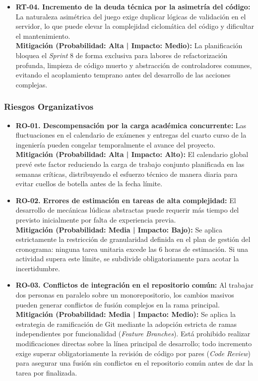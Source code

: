 \begin{itemize}
    \item \textbf{RT-04. Incremento de la deuda técnica por la asimetría del código:} La naturaleza asimétrica del juego exige duplicar lógicas de validación en el servidor, lo que puede elevar la complejidad ciclomática del código y dificultar el mantenimiento. \\
    \textbf{Mitigación (Probabilidad: Alta | Impacto: Medio):} La planificación bloquea el \textit{Sprint} 8 de forma exclusiva para labores de refactorización profunda, limpieza de código muerto y abstracción de controladores comunes, evitando el acoplamiento temprano antes del desarrollo de las acciones complejas.
\end{itemize}

\subsubsection{Riesgos Organizativos}

\begin{itemize}
    \item \textbf{RO-01. Descompensación por la carga académica concurrente:} Las fluctuaciones en el calendario de exámenes y entregas del cuarto curso de la ingeniería pueden congelar temporalmente el avance del proyecto. \\
    \textbf{Mitigación (Probabilidad: Alta | Impacto: Alto):} El calendario global prevé este factor reduciendo la carga de trabajo conjunto planificada en las semanas críticas, distribuyendo el esfuerzo técnico de manera diaria para evitar cuellos de botella antes de la fecha límite.
    
    \item \textbf{RO-02. Errores de estimación en tareas de alta complejidad:} El desarrollo de mecánicas lúdicas abstractas puede requerir más tiempo del previsto inicialmente por falta de experiencia previa. \\
    \textbf{Mitigación (Probabilidad: Media | Impacto: Bajo):} Se aplica estrictamente la restricción de granularidad definida en el plan de gestión del cronograma: ninguna tarea unitaria excede las 6 horas de estimación. Si una actividad supera este límite, se subdivide obligatoriamente para acotar la incertidumbre.
    
    \item \textbf{RO-03. Conflictos de integración en el repositorio común:} Al trabajar dos personas en paralelo sobre un monorepositorio, los cambios masivos pueden generar conflictos de fusión complejos en la rama principal. \\
    \textbf{Mitigación (Probabilidad: Media | Impacto: Medio):} Se aplica la estrategia de ramificación de Git mediante la adopción estricta de ramas independientes por funcionalidad (\textit{Feature Branches}). Está prohibido realizar modificaciones directas sobre la línea principal de desarrollo; todo incremento exige superar obligatoriamente la revisión de código por pares (\textit{Code Review}) para asegurar una fusión sin conflictos en el repositorio común antes de dar la tarea por finalizada.
\end{itemize}

